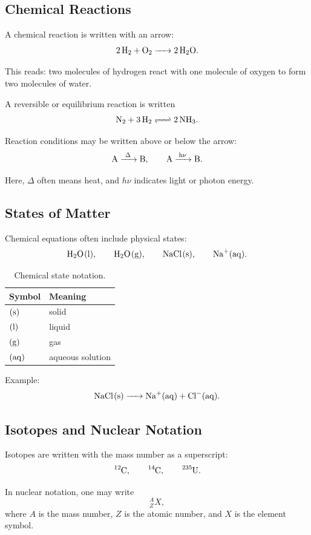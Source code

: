 \documentclass[11pt,twocolumn]{article}
\begin{document}
\subsection{Chemical Reactions}

A chemical reaction is written with an arrow:
\[
\ce{2H2 + O2 -> 2H2O}.
\]

This reads: two molecules of hydrogen react with one molecule of oxygen to
form two molecules of water.

A reversible or equilibrium reaction is written
\[
\ce{N2 + 3H2 <=> 2NH3}.
\]

Reaction conditions may be written above or below the arrow:
\[
\ce{A ->[\Delta] B},
\qquad
\ce{A ->[h\nu] B}.
\]

Here, \(\Delta\) often means heat, and \(h\nu\) indicates light or photon
energy.

\subsection{States of Matter}

Chemical equations often include physical states:
\[
\ce{H2O(l)},
\qquad
\ce{H2O(g)},
\qquad
\ce{NaCl(s)},
\qquad
\ce{Na+(aq)}.
\]

\begin{table}[ht]
\centering
\small
\caption{Chemical state notation.}
\begin{tabular}{ll}
\toprule
Symbol & Meaning \\
\midrule
\(\ce{(s)}\) & solid \\
\(\ce{(l)}\) & liquid \\
\(\ce{(g)}\) & gas \\
\(\ce{(aq)}\) & aqueous solution \\
\bottomrule
\end{tabular}
\end{table}

Example:
\[
\ce{NaCl(s) -> Na+(aq) + Cl-(aq)}.
\]

\subsection{Isotopes and Nuclear Notation}

Isotopes are written with the mass number as a superscript:
\[
\ce{^{12}C},
\qquad
\ce{^{14}C},
\qquad
\ce{^{235}U}.
\]

In nuclear notation, one may write
\[
{}^{A}_{Z}X,
\]
where \(A\) is the mass number, \(Z\) is the atomic number, and \(X\) is the
element symbol.
\end{document}
